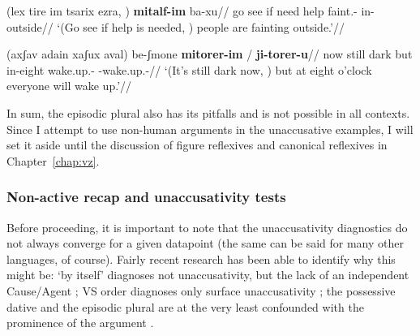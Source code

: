 		\a {} \begingl
		\gla (lex tire im tsarix ezra, ) \textbf{mitalf-im} ba-xu{\ts}//
		\glb go see if need help {} faint.- in-outside//
		\glft `(Go see if help is needed, ) people are fainting outside.'//
	\endgl
	
	\a {} \begingl
		\gla (axʃav adain xaʃux aval) be-ʃmone \textbf{mitorer-im} / \textbf{ji-torer-u}//
		\glb now still dark but in-eight wake.up.- {} -wake.up.-//
		\glft `(It's still dark now, ) but at eight o'clock everyone will wake up.'//
	\endgl
\xe

%
%

In sum, the episodic plural also has its pitfalls and is not possible in all contexts. Since I attempt to use non-human arguments in the unaccusative examples, I will set it aside until the discussion of figure reflexives and canonical reflexives in Chapter~\ref{chap:vz}.


		\subsubsection{Non-active recap and unaccusativity tests}
Before proceeding, it is important to note that the unaccusativity diagnostics do not always converge for a given datapoint (the same can be said for many other languages, of course). Fairly recent research has been able to identify why this might be: `by itself' diagnoses not unaccusativity, but the lack of an independent Cause/Agent \citep{layering15}; VS order diagnoses only surface unaccusativity \citep{kastner17gjgl}; the possessive dative and the episodic plural are at the very least confounded with the prominence of the argument \citep{gafter14li,linzen14pd}.


